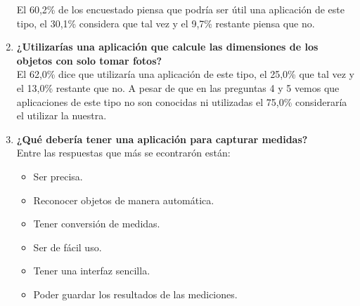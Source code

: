 \begin{enumerate}
	    El 60,2\% de los encuestado piensa que podría ser útil una aplicación de este tipo, el 30,1\% considera que tal vez y el 9,7\% restante piensa que no.
	    \item \textbf{¿Utilizarías una aplicación que calcule las dimensiones de los objetos con solo tomar fotos?}\\
	    El 62,0\% dice que utilizaría una aplicación de este tipo, el 25,0\% que tal vez y el 13,0\% restante que no. A pesar de que en las preguntas 4 y 5 vemos que aplicaciones de este tipo no son conocidas ni utilizadas el 75,0\% consideraría el utilizar la nuestra.
	    \item \textbf{¿Qué debería tener una aplicación para capturar medidas?}\\
	    Entre las respuestas que más se econtrarón están:
	    \begin{itemize}
	    \item Ser precisa.
	    \item Reconocer objetos de manera automática.
	    \item Tener conversión de medidas.
	    \item Ser de fácil uso.
	    \item Tener una interfaz sencilla.
	    \item Poder guardar los resultados de las mediciones.
	    \end{itemize}
    \end{enumerate}
	